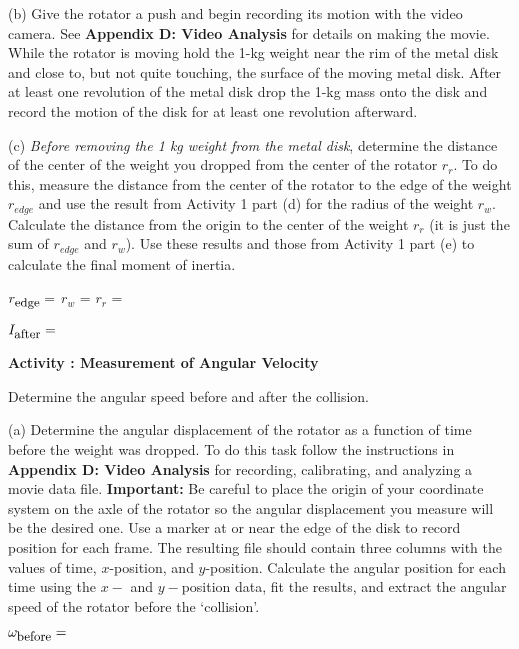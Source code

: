 (b) Give the rotator a push and begin recording its motion with the video camera. 
See \textbf{Appendix D: Video Analysis} for details on making the movie. While the rotator is moving
hold the 1-kg weight near the rim of the metal disk and close to, but not quite
touching, the surface of the moving metal disk. After at least one revolution
of the metal disk drop the 1-kg mass onto the disk and record the motion of
the disk for at least one revolution afterward. 

(c) \textit{Before removing the 1 kg weight from the metal disk}, 
determine the distance of the center of the weight you dropped from the center of the rotator \( r_{r} \). 
To do this, measure the distance from the center
of the rotator to the edge of the weight \( r_{edge} \) and use the result from Activity 1 part (d) 
for the radius of the weight \( r_{w} \). 
Calculate the distance from the origin to the center of the weight \( r_{r} \) (it is just the 
sum of \( r_{edge} \) and \( r_{w} \)). 
Use these results and those from Activity 1 part (e) to calculate the final moment of inertia.
\vspace{5mm}

\( r_{\mbox{\small edge}}  =\) \hfill{}\( r_{w} \) = \hfill{}\( r_{r} \) =\hfill{}
\vspace{5mm}

\( I_{\mbox{\small after}} =\)  
\vspace{5mm}

\textbf{Activity  : Measurement of Angular Velocity}

Determine the angular speed before and after the collision.

(a) Determine the angular displacement of the rotator as a function of time before the weight was dropped. 
To do this task follow the instructions in \textbf{Appendix D: Video Analysis} for recording, calibrating, and analyzing a movie data file. 
\textbf{Important:} Be careful to place the origin of your coordinate system on the axle of the
rotator so the angular displacement you measure will be the desired one. 
Use a marker at or near the edge of the disk to record position for each frame. 
The resulting file should contain three columns with the values of time, $x$-position, and $y$-position.
Calculate the angular position for each time using the $x-$ and $y-$position data, fit the results,
and extract the angular speed of the rotator before the `collision'.

\( \omega _{\mbox{\small before}}=\)

